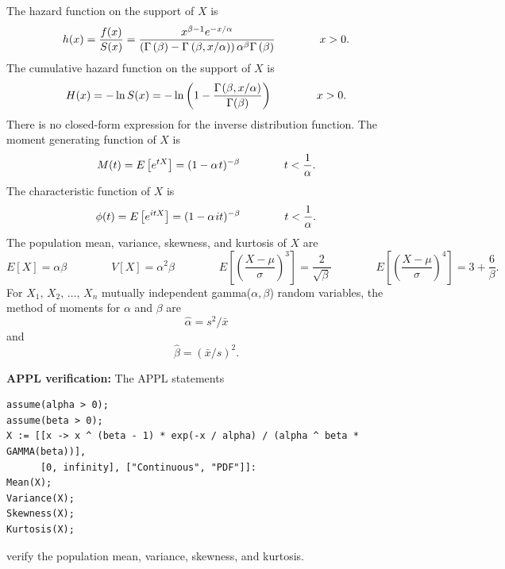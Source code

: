 \documentclass[12pt,fullpage]{article}
\begin{document}
The hazard function on the support of $X$ is
$$
h(x) = \frac{f(x)}{S(x)} =
\frac{x ^ {\beta - 1} e ^ {-x / \alpha}}
{\left(\Gamma \left(\beta \right) - \Gamma \kern 0.04 em \left(\beta, x / \alpha \right)\right)
\alpha ^ \beta \Gamma\left(\beta \right) } \qquad \qquad x > 0.
$$
The cumulative hazard function on the support of $X$ is
$$
H(x) = - \ln S(x) =
- \ln \left(
1- \frac{\Gamma \kern 0.08 em (\beta, x/\alpha)}{\Gamma (\beta)} 
\right)
\qquad \qquad x > 0.
$$
There is no closed-form expression for the inverse distribution function.
The moment generating function of $X$ is
$$
M(t) = E\left[ e ^ {tX} \right] = (1 - \alpha \kern 0.08 em t) ^ {-\beta} \qquad \qquad t < \frac{1} {\alpha}.
$$
The characteristic function of $X$ is
$$
\phi(t) = E\left[ e ^ {itX} \right] = (1-\alpha \kern 0.08 em it) ^ {-\beta} \qquad \qquad t < \frac{1} {\alpha}.
$$
The population mean, variance, skewness, and kurtosis of $X$ are
$$
E[X] = \alpha \beta \qquad \qquad 
V[X] =   \alpha ^ {2} \beta \qquad \qquad 
E\left[ \left( \frac{X - \mu} {\sigma} \right) ^ 3 \right] = \frac{2}{\sqrt{\beta}} \qquad \qquad 
E\left[ \left( \frac{X - \mu} {\sigma} \right) ^ 4 \right] = 3 + \frac{6} {\beta}.
$$
For $X_1, \, X_2, \, \ldots , \, X_n$ mutually independent gamma($\alpha,\beta$) random variables,
the method of moments for $\alpha$ and $\beta$ are 
$$
\hat \alpha = s ^ 2 / \bar x 
$$
and
$$
\hat \beta = \left( \bar x / s \right) ^ 2.
$$
%
%

\vspace{0.1in}

\noindent
{\bf APPL verification:}
The APPL statements
\begin{verbatim}
assume(alpha > 0);
assume(beta > 0);
X := [[x -> x ^ (beta - 1) * exp(-x / alpha) / (alpha ^ beta * GAMMA(beta))],
      [0, infinity], ["Continuous", "PDF"]]:
Mean(X);
Variance(X);
Skewness(X);
Kurtosis(X);
\end{verbatim}
verify the population mean, variance, skewness, and kurtosis.
\end{document}
